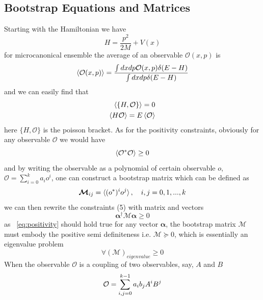 \documentclass[aps, preprint,amsmath, amssymb]{revtex4-2}
\begin{document}
\subsection{Bootstrap Equations and Matrices}
Starting with the Hamiltonian we have
\begin{equation}
	H = \frac{p^2}{2M} + V(x)\label{eq:hamiltonian}
\end{equation}
for microcanonical ensemble the average of an observable $\mathcal{O}(x, p)$ is
\begin{equation}
	\braket{\mathcal{O}(x, p)} = \frac{\int dxdp\mathcal{O}(x, p)\delta (E - H)}{\int dxdp\delta (E - H)}
\end{equation}
and we can easily find that
\begin{align}
	\braket{\{H, \mathcal{O}\}} = 0 \label{eq:beq0} \\
	\braket{H \mathcal{O}} = E \braket{\mathcal{O}} \label{eq:beq1}
\end{align}
here $\{H, \mathcal{O}\}$ is the poisson bracket.
As for the positivity constraints, obviously for any observable $\mathcal{O}$ we would have
\begin{equation}
	\braket{\mathcal{O}^* \mathcal{O}} \geq 0 \label{eq:pos}
\end{equation}
and by writing the observable as a polynomial of certain observable $o$, $\mathcal{O} = \sum_{i = 0}^k a_i o^i$, one can construct a bootstrap matrix which can be defined as
\begin{equation}
	\bm{\mathcal{M}}_{ij} = \braket{(o^*)^i o^j}, \ \ \ i, j = 0, 1, ..., k
\end{equation}
we can then rewrite the constraints (5) with matrix and vectors
\begin{equation}
	\bm{\alpha}^\dagger \bm{\mathcal{M} \bm{\alpha}} \geq 0\label{eq:positivity}
\end{equation}
as ~\eqref{eq:positivity} should hold true for any vector $\bm{\alpha}$, the bootstrap matrix $\bm{\mathcal{M}}$ must embody the positive semi definiteness i.e. $\bm{\mathcal{M}} \succeq 0$, which is essentially an eigenvalue problem
\begin{equation}
	\forall (\bm{\mathcal{M}})_{eigenvalue} \geq 0
\end{equation}
When the observable $\mathcal{O}$ is a coupling of two observables, say, $A$ and $B$
\begin{equation}
	\mathcal{O} = \sum_{i, j = 0}^{k - 1} a_i b_j A^i B^j\\
\end{equation}
\end{document}
